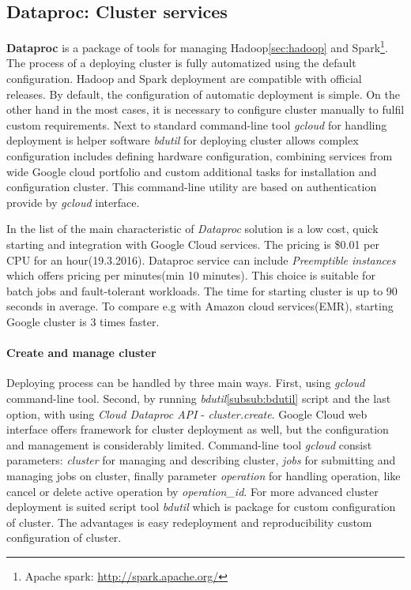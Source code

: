 \documentclass[a4paper,12pt,oneside]{report}
\begin{document}

		\subsection{Dataproc: Cluster services}
		\label{subsub:dataproc}
\textbf{Dataproc} is a package of tools for managing Hadoop\ref{sec:hadoop} 
and Spark\footnote{Apache spark: \url{http://spark.apache.org/}}.
The process of a deploying cluster is fully automatized using the default 
configuration. Hadoop and Spark deployment are compatible with official
releases. By default, the configuration of automatic deployment is simple. 
On the other hand in the most cases, it is 
necessary to configure cluster manually to fulfil custom requirements. 
Next to standard command-line tool \textit{gcloud} for handling deployment is 
helper software \emph{bdutil} for deploying cluster allows complex 
configuration includes 
defining hardware configuration, combining services from wide Google cloud 
portfolio and custom additional tasks for installation and configuration cluster. 
This command-line utility are based on authentication provide by \textit{gcloud} interface.

In the list of the main characteristic of \textit{Dataproc} solution is a 
low cost, quick starting and integration with Google Cloud services. 
The pricing is  \$0.01 per CPU for an hour(19.3.2016). Dataproc service can 
include \textit{Preemptible instances} which offers pricing 
per minutes(min 10 minutes). This choice is suitable for batch jobs and 
fault-tolerant workloads. The time for starting cluster is up to 
90 seconds in average. To compare e.g with Amazon cloud services(EMR)\cite{amazon_emr}, 
starting Google cluster is 3 times faster.

\paragraph{Create and manage cluster} Deploying process can be handled by three main 
ways. First, using \textit{gcloud} command-line tool. Second, by running \textit{bdutil}\ref{subsub:bdutil} 
script and the last option, with using 
\textit{Cloud Dataproc API} - \textit{cluster.create}. Google Cloud web interface offers 
framework for cluster deployment as well, but the configuration and 
management is considerably limited. 
Command-line tool \textit{gcloud} consist parameters: \textit{cluster} for managing and 
describing cluster, \textit{jobs} for submitting 
and managing jobs on cluster, finally parameter \textit{operation} for handling operation, 
like cancel or delete active
 operation by \emph{operation\_id}. For more advanced cluster deployment is suited script 
 tool \textit{bdutil} which is 
 package for custom configuration of cluster. The advantages is easy redeployment and 
 reproducibility custom
  configuration of cluster. 
\end{document}
